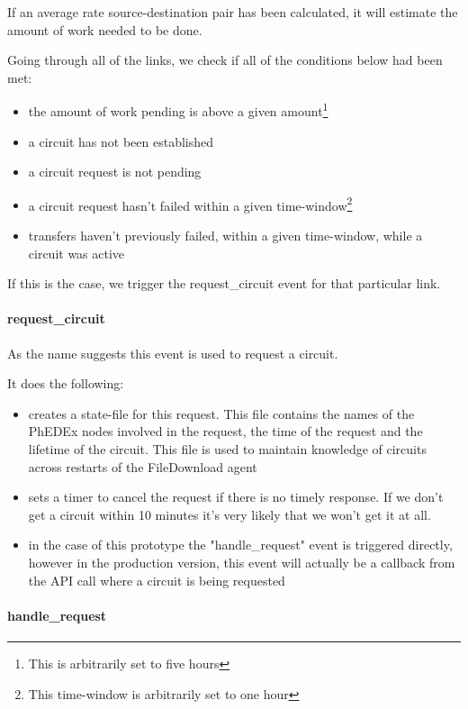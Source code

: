 If an average rate source-destination pair has been calculated, it will estimate
the amount of work needed to be done.

Going through all of the links, we check if all of the conditions below had been met:
\begin{itemize}
  \item the amount of work pending is above a given amount\footnote{This is arbitrarily set to five hours}
  \item a circuit has not been established
  \item a circuit request is not pending
  \item a circuit request hasn't failed within a given time-window\footnote{This time-window is arbitrarily set to one hour}
  \item transfers haven't previously failed, within a given time-window, while a circuit was active 
\end{itemize}

If this is the case, we trigger the request\_circuit event for that particular link.

\paragraph{request\_circuit}

As the name suggests this event is used to request a circuit.

It does the following:
\begin{itemize}
  \item creates a state-file for this request. This file contains the names of the PhEDEx nodes involved in the request, the time of the request and the 
lifetime of the circuit. This file is used to maintain knowledge of circuits across restarts of the FileDownload agent
  \item sets a timer to cancel the request if there is no timely response. If we don't
get a circuit within 10 minutes it's very likely that we won't get it at all.
  \item in the case of this prototype the "handle\_request" event is triggered directly,
however in the production version, this event will actually be a callback
from the API call where a circuit is being requested
\end{itemize}

\paragraph{handle\_request}

